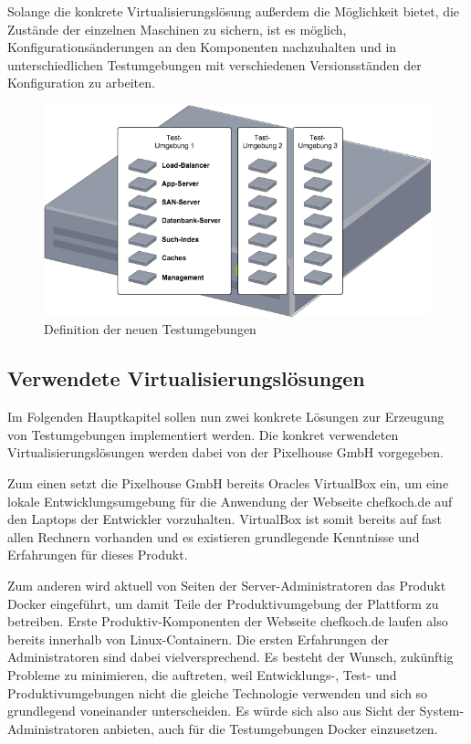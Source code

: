 Solange die konkrete Virtualisierungslösung außerdem die Möglichkeit bietet, die Zustände der einzelnen Maschinen zu sichern, ist es möglich, Konfigurationsänderungen an den Komponenten nachzuhalten und in unterschiedlichen Testumgebungen mit verschiedenen Versionsständen der Konfiguration zu arbeiten. 

\begin{figure}[!ht]
  \begin{center}
    \includegraphics[width=14cm]{bilder/Untersuchungs-Umgebung.png}
    \caption{Definition der neuen Testumgebungen}
  \end{center}
\end{figure}

\subsection{Verwendete Virtualisierungslösungen}

Im Folgenden Hauptkapitel sollen nun zwei konkrete Lösungen zur Erzeugung von Testumgebungen implementiert werden. Die konkret verwendeten Virtualisierungslösungen werden dabei von der Pixelhouse GmbH vorgegeben.

Zum einen setzt die Pixelhouse GmbH bereits Oracles VirtualBox ein, um eine lokale Entwicklungsumgebung für die Anwendung der Webseite chefkoch.de auf den Laptops der Entwickler vorzuhalten. VirtualBox ist somit bereits auf fast allen Rechnern vorhanden und es existieren grundlegende Kenntnisse und Erfahrungen für dieses Produkt.

Zum anderen wird aktuell von Seiten der Server-Administratoren das Produkt Docker eingeführt, um damit Teile der Produktivumgebung der Plattform zu betreiben. Erste Produktiv-Komponenten der Webseite chefkoch.de laufen also bereits innerhalb von Linux-Containern. Die ersten Erfahrungen der Administratoren sind dabei vielversprechend. Es besteht der Wunsch, zukünftig Probleme zu minimieren, die auftreten, weil Entwicklungs-, Test- und Produktivumgebungen nicht die gleiche Technologie verwenden und sich so grundlegend voneinander unterscheiden. Es würde sich also aus Sicht der System-Administratoren anbieten, auch für die Testumgebungen Docker einzusetzen.
